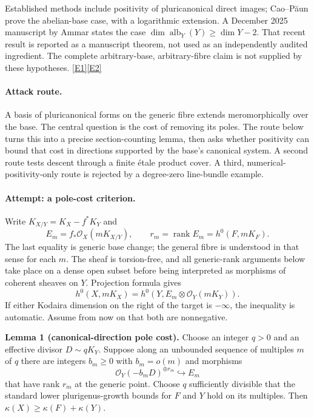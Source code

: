 \documentclass[11pt,a4paper]{article}
\newcommand{\eref}[2]{\hyperlink{extra:#1:#2}{[E#2]}}
\numberwithin{equation}{section}
\begin{document}
Established methods include positivity of pluricanonical direct images;
Cao--P\u{a}un prove the abelian-base case, with a logarithmic extension.
A December 2025 manuscript by Ammar states the case
$\dim\operatorname{alb}_Y(Y)\geq\dim Y-2$. That recent result is reported
as a manuscript theorem, not used as an independently audited ingredient.
The complete arbitrary-base, arbitrary-fibre claim is not supplied by
these hypotheses. \eref{114}{1}\eref{114}{2}

\paragraph{Attack route.}
A basis of pluricanonical forms on the generic fibre extends meromorphically
over the base. The central question is the cost of removing its poles.
The route below turns this into a precise section-counting lemma, then
asks whether positivity can bound that cost in directions supported by
the base's canonical system. A second route tests descent through a
finite \'etale product cover. A third, numerical-positivity-only route is
rejected by a degree-zero line-bundle example.

\paragraph{Attempt: a pole-cost criterion.}
Write $K_{X/Y}=K_X-f^*K_Y$ and
\[
 E_m=f_*\mathcal O_X(mK_{X/Y}),\qquad
 r_m=\operatorname{rank}E_m=h^0(F,mK_F).
\]
The last equality is generic base change; the general fibre is understood
in that sense for each $m$. The sheaf is torsion-free, and all generic-rank
arguments below take place on a dense open subset before being interpreted
as morphisms of coherent sheaves on $Y$. Projection formula gives
\begin{equation}\label{eq:114:projection}
 h^0(X,mK_X)=h^0(Y,E_m\otimes\mathcal O_Y(mK_Y)).
\end{equation}
If either Kodaira dimension on the right of the target is $-\infty$, the
inequality is automatic. Assume from now on that both are nonnegative.

\textbf{Lemma 1 (canonical-direction pole cost).}
Choose an integer $q>0$ and an effective divisor $D\sim qK_Y$.
Suppose along an unbounded sequence of multiples $m$ of $q$ there are
integers $b_m\geq0$ with $b_m=o(m)$ and morphisms
\begin{equation}\label{eq:114:injection}
 \mathcal O_Y(-b_mD)^{\oplus r_m}\hookrightarrow E_m
\end{equation}
that have rank $r_m$ at the generic point. Choose $q$ sufficiently divisible
that the standard lower plurigenus-growth bounds for $F$ and $Y$ hold on
its multiples. Then $\kappa(X)\geq\kappa(F)+\kappa(Y)$.
\end{document}
